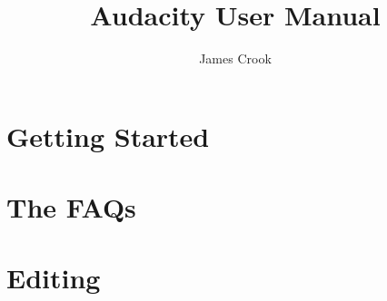 \documentclass[openany]{book}
\begin{document}
{\let\cleardoublepage\clearpage 
\title{Audacity User Manual}
\author{James Crook}
}





\chapter{Getting Started}

\label{XXX}



%


\chapter{The FAQs}
















\chapter{Editing}












\end{document}
